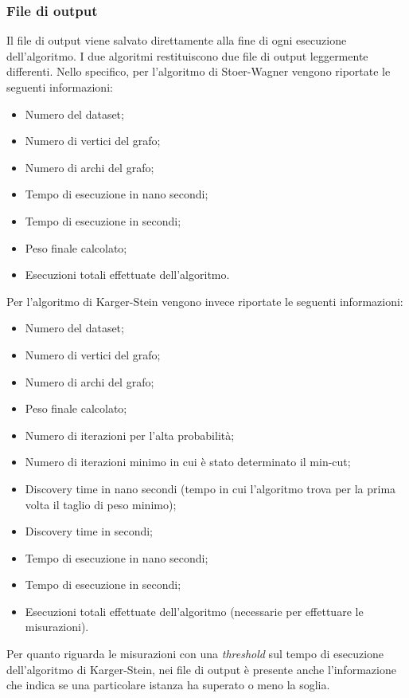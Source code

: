 \subsubsection{File di output}

Il file di output viene salvato direttamente alla fine di ogni esecuzione dell'algoritmo. I due algoritmi restituiscono due file di output leggermente differenti. Nello specifico, per l'algoritmo di Stoer-Wagner vengono riportate le seguenti informazioni:

\begin{itemize}
    \item Numero del dataset;
    \item Numero di vertici del grafo;
    \item Numero di archi del grafo;
    \item Tempo di esecuzione in nano secondi;
    \item Tempo di esecuzione in secondi;
    \item Peso finale calcolato;
    \item Esecuzioni totali effettuate dell'algoritmo.
\end{itemize}

\noindent Per l'algoritmo di Karger-Stein vengono invece riportate le seguenti informazioni:

\begin{itemize}
  \item Numero del dataset;
  \item Numero di vertici del grafo;
  \item Numero di archi del grafo;
  \item Peso finale calcolato;
  \item Numero di iterazioni per l'alta probabilità;
  \item Numero di iterazioni minimo in cui è stato determinato il min-cut;
  \item Discovery time in nano secondi (tempo in cui l'algoritmo trova per la prima volta il taglio di peso minimo);
  \item Discovery time in secondi;
  \item Tempo di esecuzione in nano secondi;
  \item Tempo di esecuzione in secondi;
  \item Esecuzioni totali effettuate dell'algoritmo (necessarie per effettuare le misurazioni).
\end{itemize}

Per quanto riguarda le misurazioni con una \textit{threshold} sul tempo di esecuzione 
dell'algoritmo di Karger-Stein, nei file di output è presente anche l'informazione 
che indica se una particolare istanza ha superato o meno la soglia.


